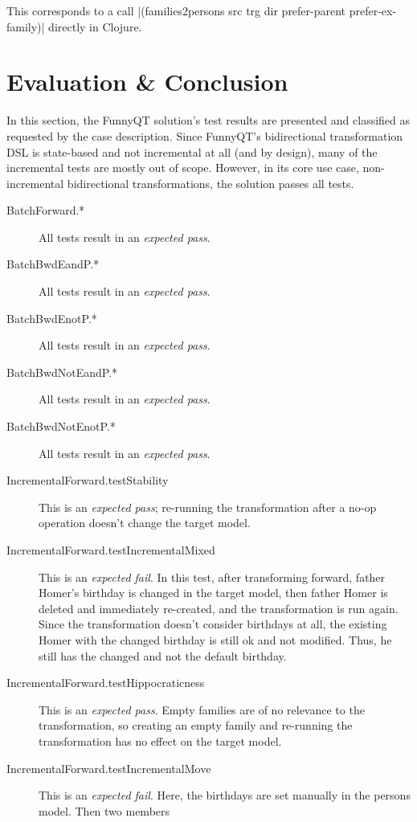 \documentclass[a4paper]{article}
\newcommand{\code}{\clojureinline}
\begin{document}
This corresponds to a call
\code|(families2persons src trg dir prefer-parent prefer-ex-family)| directly
in Clojure.

\section{Evaluation \& Conclusion}
\label{sec:evaluation}

In this section, the FunnyQT solution's test results are presented and
classified as requested by the case description.  Since FunnyQT's bidirectional
transformation DSL is state-based and not incremental at all (and by design),
many of the incremental tests are mostly out of scope.  However, in its core
use case, non-incremental bidirectional transformations, the solution passes
all tests.

\begin{description}
\item[BatchForward.*] All tests result in an \emph{expected pass}.
\item[BatchBwdEandP.*] All tests result in an \emph{expected pass}.
\item[BatchBwdEnotP.*] All tests result in an \emph{expected pass}.
\item[BatchBwdNotEandP.*] All tests result in an \emph{expected pass}.
\item[BatchBwdNotEnotP.*] All tests result in an \emph{expected pass}.
\item[IncrementalForward.testStability] This is an \emph{expected pass};
  re-running the transformation after a no-op operation doesn't change the
  target model.
\item[IncrementalForward.testIncrementalMixed] This is an \emph{expected fail}.
  In this test, after transforming forward, father Homer's birthday is changed
  in the target model, then father Homer is deleted and immediately re-created,
  and the transformation is run again.  Since the transformation doesn't
  consider birthdays at all, the existing Homer with the changed birthday is
  still ok and not modified.  Thus, he still has the changed and not the
  default birthday.
\item[IncrementalForward.testHippocraticness] This is an \emph{expected pass}.
  Empty families are of no relevance to the transformation, so creating an
  empty family and re-running the transformation has no effect on the target
  model.
\item[IncrementalForward.testIncrementalMove] This is an \emph{expected fail}.
  Here, the birthdays are set manually in the persons model.  Then two members

\end{description}
\end{document}
